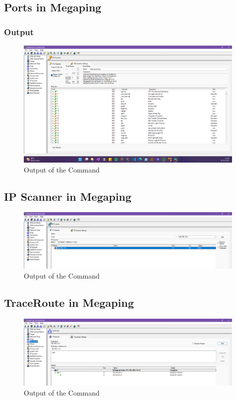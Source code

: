 \documentclass[11pt]{article}
\begin{document}
\subsection{Ports in Megaping}

\subsubsection*{Output}
\begin{figure}[H]
    \centering
    \includegraphics[width=0.99\textwidth]{megaping .png}
    \caption{Output of the Command}
\end{figure}

\subsection{IP Scanner in Megaping}
\begin{figure}[H]
    \centering
    \includegraphics[width=0.99\textwidth]{megaping (2).png}
    \caption{Output of the Command}
\end{figure}
\subsection{TraceRoute in Megaping}
\begin{figure}[H]
    \centering
    \includegraphics[width=0.99\textwidth]{megaping (3).png}
    \caption{Output of the Command}
\end{figure}
\end{document}
